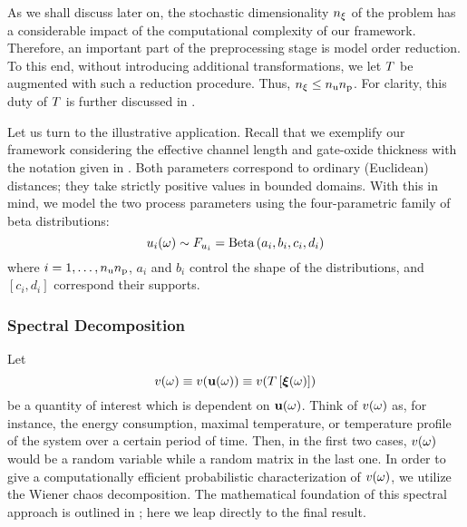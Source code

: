 As we shall discuss later on, the stochastic dimensionality ${n_\xi}$ of the problem has a considerable impact of the computational complexity of our framework.
Therefore, an important part of the preprocessing stage is model order reduction.
To this end, without introducing additional transformations, we let $\transformation$ be augmented with such a reduction procedure.
Thus, ${n_\xi} \leq {n_\text{u}} {n_\text{p}}$.
For clarity, this duty of $\transformation$ is further discussed in .

Let us turn to the illustrative application.
Recall that we exemplify our framework considering the effective channel length and gate-oxide thickness with the notation given in .
Both parameters correspond to ordinary (Euclidean) distances; they take strictly positive values in bounded domains.
With this in mind, we model the two process parameters using the four-parametric family of beta distributions:
\begin{equation*}
  u_i(\omega) \sim F_{u_i} = \text{Beta}\left( a_i, b_i, c_i, d_i \right)
\end{equation*}
where $i = 1, \dots, {n_\text{u}} {n_\text{p}}$, $a_i$ and $b_i$ control the shape of the distributions, and $[ c_i, d_i ]$ correspond their supports.

\subsubsection{Spectral Decomposition}
Let
\[
  \w(\o) \equiv \w(\vu(\o)) \equiv \w(\transformation{\vz(\o)})
\]
be a quantity of interest which is dependent on $\mathbf{u}(\omega)$.
Think of $v(\omega)$ as, for instance, the energy consumption, maximal temperature, or temperature profile of the system over a certain period of time.
Then, in the first two cases, $v(\omega)$ would be a random variable while a random matrix in the last one.
In order to give a computationally efficient probabilistic characterization of $v(\omega)$, we utilize the Wiener chaos decomposition.
The mathematical foundation of this spectral approach is outlined in ; here we leap directly to the final result.

